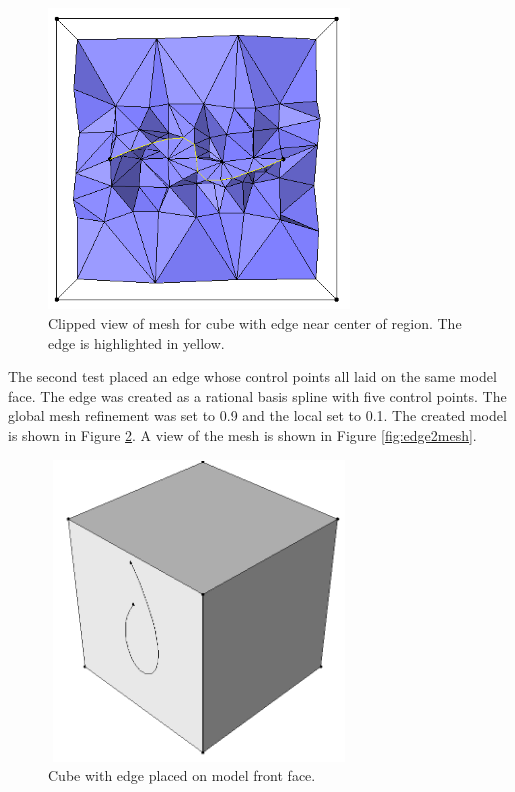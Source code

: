 \documentclass[a4paper, 12pt]{article}
\begin{document}
\begin{figure}[H]
  \centering
  \includegraphics[width=8cm, height=8cm]{test6_sms_clipped}
  \caption{Clipped view of mesh for cube with edge near center of region. 
          The edge is highlighted in yellow.}
  \label{fig:edge1mesh}
\end{figure}

The second test placed an edge whose control points all laid on the same 
model face. 
The edge was created as a rational basis spline with five control points.
The global mesh refinement was set to 0.9 and the local set to 0.1. 
The created model is shown in Figure \ref{fig:edge2model}.
A view of the mesh is shown in Figure \ref{fig:edge2mesh}.

\begin{figure}[H]
  \centering
  \includegraphics[width=8cm, height=8cm]{test7_smd}
  \caption{Cube with edge placed on model front face.}
  \label{fig:edge2model}
\end{figure}
\end{document}
